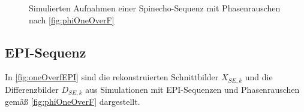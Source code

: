 \begin{figure}[H]
	\hfill
	\hfill
	\caption[($1/f$)-Rauschen (Spinecho-Sequenz)]{Simulierten Aufnahmen einer Spinecho-Sequenz mit Phasenrauschen nach \autoref{fig:phiOneOverF}}
	\label{fig:oneOverfSE}	
\end{figure}

\subsection{EPI-Sequenz}
In \autoref{fig:oneOverfEPI} sind die rekonstruierten Schnittbilder $X_{SE,k}$ und die Differenzbilder $D_{SE,k}$ aus Simulationen mit EPI-Sequenzen und Phasenrauschen gemäß \autoref{fig:phiOneOverF} dargestellt.


